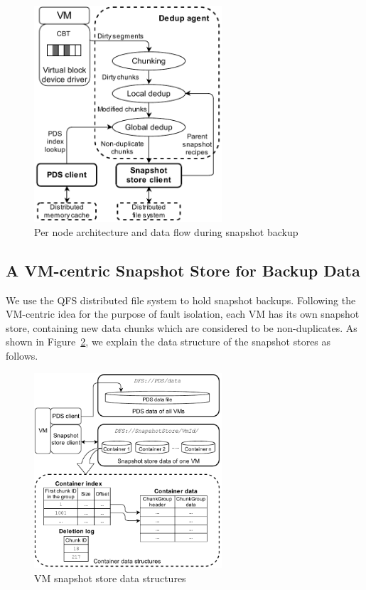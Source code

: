 \begin{figure}[htbp]
    \centering
    \includegraphics[width=2.75in]{images/socc_arch_cluster}
    \caption{Per node architecture and data flow during snapshot backup}
    \label{fig:arch_vm}
\end{figure}

\subsection{A VM-centric Snapshot Store for Backup Data}
\label{sect:store}
We use the QFS distributed file system to hold snapshot backups.
Following the VM-centric idea for the purpose of fault isolation,
each VM has its own snapshot store, containing new data chunks which are considered
to be non-duplicates.
As shown in Figure~\ref{fig:as_arch}, we explain the data structure of the snapshot stores as follows.
\begin{figure}[htbp]
  \centering
  \includegraphics[width=2.75in]{images/sstore_arch}
  \caption{VM snapshot store data structures}
  \label{fig:as_arch}
\end{figure}


